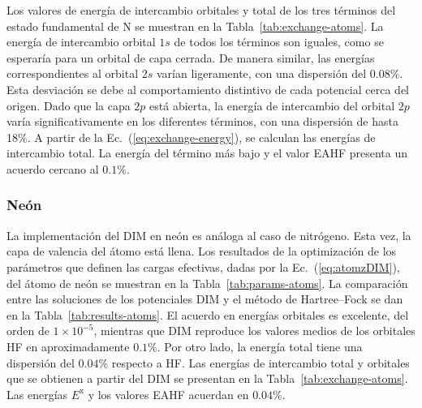 Los valores de energía de intercambio orbitales y total de los tres 
términos del estado fundamental de N se muestran en la 
Tabla~\ref{tab:exchange-atoms}. La energía de intercambio orbital $1s$ 
de todos los términos son iguales, como se esperaría para un orbital de 
capa cerrada. De manera similar, las energías correspondientes al 
orbital $2s$ varían ligeramente, con una dispersión del $0.08\%$. Esta 
desviación se debe al comportamiento distintivo de cada potencial cerca 
del origen. Dado que la capa $2p$ está abierta, la energía de 
intercambio del orbital $2p$ varía significativamente en los diferentes 
términos, con una dispersión de hasta 18\%. 
A partir de la Ec.~(\ref{eq:exchange-energy}), se calculan las energías 
de intercambio total. La energía del término más bajo y el valor EAHF 
presenta un acuerdo cercano al $0.1\%$.

\subsubsection*{Neón}

La implementación del DIM en neón es análoga al caso de nitrógeno. Esta
vez, la capa de valencia del átomo está llena. Los resultados de la 
optimización de los parámetros que definen las cargas efectivas, dadas 
por la Ec.~(\ref{eq:atomzDIM}), del átomo de neón se muestran en la 
Tabla~\ref{tab:params-atoms}. La comparación entre las soluciones de los 
potenciales DIM y el método de Hartree--Fock se dan en la 
Tabla~\ref{tab:results-atoms}. El acuerdo en energías orbitales es 
excelente, del orden de $1\times 10^{-5}$, mientras que DIM reproduce 
los valores medios de los orbitales HF en aproximadamente $0.1\%$. Por 
otro lado, la energía total tiene una dispersión del $0.04\%$ respecto 
a HF. Las energías de intercambio total y orbitales que se obtienen a 
partir del DIM se presentan en la Tabla~\ref{tab:exchange-atoms}. Las 
energías $E^{\mathrm{x}}$ y los valores EAHF acuerdan en $0.04\%$.

